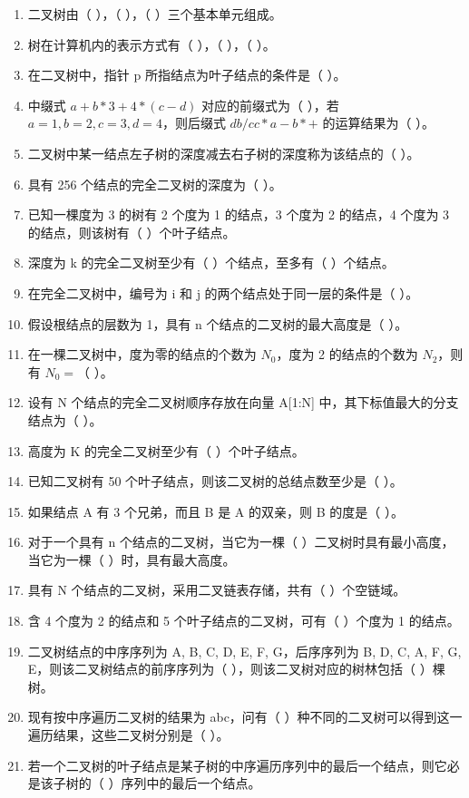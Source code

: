 \documentclass[12pt, a4paper]{article}
\begin{document}
\begin{enumerate}
	\item 二叉树由（ ），（ ），（ ）三个基本单元组成。
	\item 树在计算机内的表示方式有（ ），（ ），（ ）。
	\item 在二叉树中，指针 p 所指结点为叶子结点的条件是（ ）。
	\item 中缀式 $a+b*3+4*(c-d)$ 对应的前缀式为（ ），若 $a=1, b=2, c=3, d=4$，则后缀式 $db/cc*a-b*+$ 的运算结果为（ ）。
	\item 二叉树中某一结点左子树的深度减去右子树的深度称为该结点的（ ）。
	\item 具有 256 个结点的完全二叉树的深度为（ ）。
	\item 已知一棵度为 3 的树有 2 个度为 1 的结点，3 个度为 2 的结点，4 个度为 3 的结点，则该树有（ ）个叶子结点。
	\item 深度为 k 的完全二叉树至少有（ ）个结点，至多有（ ）个结点。
	\item 在完全二叉树中，编号为 i 和 j 的两个结点处于同一层的条件是（ ）。
	\item 假设根结点的层数为 1，具有 n 个结点的二叉树的最大高度是（ ）。
	\item 在一棵二叉树中，度为零的结点的个数为 $N_0$，度为 2 的结点的个数为 $N_2$，则有 $N_0=$（ ）。
	\item 设有 N 个结点的完全二叉树顺序存放在向量 A[1:N] 中，其下标值最大的分支结点为（ ）。
	\item 高度为 K 的完全二叉树至少有（ ）个叶子结点。
	\item 已知二叉树有 50 个叶子结点，则该二叉树的总结点数至少是（ ）。
	\item 如果结点 A 有 3 个兄弟，而且 B 是 A 的双亲，则 B 的度是（ ）。
	\item 对于一个具有 n 个结点的二叉树，当它为一棵（ ）二叉树时具有最小高度，当它为一棵（ ）时，具有最大高度。
	\item 具有 N 个结点的二叉树，采用二叉链表存储，共有（ ）个空链域。
	\item 含 4 个度为 2 的结点和 5 个叶子结点的二叉树，可有（ ）个度为 1 的结点。
	\item 二叉树结点的中序序列为 A, B, C, D, E, F, G，后序序列为 B, D, C, A, F, G, E，则该二叉树结点的前序序列为（ ），则该二叉树对应的树林包括（ ）棵树。
	\item 现有按中序遍历二叉树的结果为 abc，问有（ ）种不同的二叉树可以得到这一遍历结果，这些二叉树分别是（ ）。
	\item 若一个二叉树的叶子结点是某子树的中序遍历序列中的最后一个结点，则它必是该子树的（ ）序列中的最后一个结点。

\end{enumerate}
\end{document}
